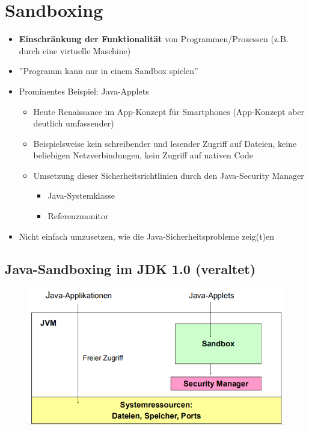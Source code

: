 \documentclass[openany]{book}
\begin{document}
\section{Sandboxing}

\begin{itemize}
    \item \textbf{Einschränkung der Funktionalität} von Programmen/Prozessen (z.B. durch eine virtuelle Maschine)
    \item ''Programm kann nur in einem Sandbox spielen''
    \item Prominentes Beispiel: Java-Applets
    \begin{itemize}
        \item Heute Renaissance im App-Konzept für Smartphones (App-Konzept aber deutlich umfassender)
        \item Beispielsweise kein schreibender und lesender Zugriff auf Dateien, keine beliebigen Netzverbindungen, kein Zugriff auf nativen Code
        \item Umsetzung dieser Sicherheitsrichtlinien durch den Java-Security Manager
        \begin{itemize}
            \item Java-Systemklasse
            \item Referenzmonitor
        \end{itemize}
    \end{itemize}
    \item Nicht einfach umzusetzen, wie die Java-Sicherheitsprobleme zeig(t)en
\end{itemize}

\subsection{Java-Sandboxing im JDK 1.0 (veraltet)}

\begin{figure}[h!]
    \centering
    \includegraphics[width=0.85\linewidth]{Pics/JDKSandbox.PNG}
\end{figure}
\end{document}
